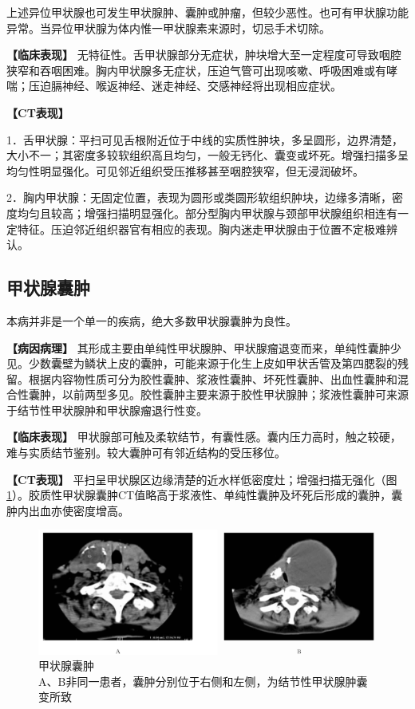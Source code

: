上述异位甲状腺也可发生甲状腺肿、囊肿或肿瘤，但较少恶性。也可有甲状腺功能异常。当异位甲状腺为体内惟一甲状腺素来源时，切忌手术切除。

\textbf{【临床表现】}
无特征性。舌甲状腺部分无症状，肿块增大至一定程度可导致咽腔狭窄和吞咽困难。胸内甲状腺多无症状，压迫气管可出现咳嗽、呼吸困难或有哮喘；压迫膈神经、喉返神经、迷走神经、交感神经将出现相应症状。

\textbf{【CT表现】}

1．舌甲状腺：平扫可见舌根附近位于中线的实质性肿块，多呈圆形，边界清楚，大小不一；其密度多较软组织高且均匀，一般无钙化、囊变或坏死。增强扫描多呈均匀性明显强化。可见邻近组织受压推移甚至咽腔狭窄，但无浸润破坏。

2．胸内甲状腺：无固定位置，表现为圆形或类圆形软组织肿块，边缘多清晰，密度均匀且较高；增强扫描明显强化。部分型胸内甲状腺与颈部甲状腺组织相连有一定特征。压迫邻近组织器官有相应的表现。胸内迷走甲状腺由于位置不定极难辨认。

\subsection{甲状腺囊肿}

本病并非是一个单一的疾病，绝大多数甲状腺囊肿为良性。

\textbf{【病因病理】}
其形成主要由单纯性甲状腺肿、甲状腺瘤退变而来，单纯性囊肿少见。少数囊壁为鳞状上皮的囊肿，可能来源于化生上皮如甲状舌管及第四腮裂的残留。根据内容物性质可分为胶性囊肿、浆液性囊肿、坏死性囊肿、出血性囊肿和混合性囊肿，以前两型多见。胶性囊肿主要来源于胶性甲状腺肿；浆液性囊肿可来源于结节性甲状腺肿和甲状腺瘤退行性变。

\textbf{【临床表现】}
甲状腺部可触及柔软结节，有囊性感。囊内压力高时，触之较硬，难与实质结节鉴别。较大囊肿可有邻近结构的受压移位。

\textbf{【CT表现】}
平扫呈甲状腺区边缘清楚的近水样低密度灶；增强扫描无强化（图\ref{fig8-8}）。胶质性甲状腺囊肿CT值略高于浆液性、单纯性囊肿及坏死后形成的囊肿，囊肿内出血亦使密度增高。

\begin{figure}[!htbp]
 \centering
 \includegraphics[width=.7\textwidth,height=\textheight,keepaspectratio]{./images/Image00176.jpg}
 \captionsetup{justification=centering}
 \caption{甲状腺囊肿\\{\small A、B非同一患者，囊肿分别位于右侧和左侧，为结节性甲状腺肿囊变所致}}
 \label{fig8-8}
  \end{figure} 

